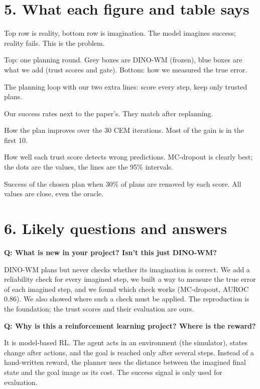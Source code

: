 \documentclass[11pt,a4paper]{article}
\newcommand{\Q}[1]{\par\medskip\noindent\textbf{\color{accent}Q: #1}\par\nopagebreak}
\newcommand{\A}{\noindent}
\begin{document}
\section*{5. What each figure and table says}
\begin{description}[leftmargin=0pt,style=nextline]
\item[Fig.~1 (failure example)] Top row is reality, bottom row is imagination. The model imagines success; reality fails. This is the problem.
\item[Fig.~2 (architecture)] Top: one planning round. Grey boxes are DINO-WM (frozen), blue boxes are what we add (trust scores and gate). Bottom: how we measured the true error.
\item[Algorithm~1] The planning loop with our two extra lines: score every step, keep only trusted plans.
\item[Table~I and Fig.~3] Our success rates next to the paper's. They match after replanning.
\item[Fig.~4] How the plan improves over the 30 CEM iterations. Most of the gain is in the first 10.
\item[Table~II and Fig.~5] How well each trust score detects wrong predictions. MC-dropout is clearly best; the dots are the values, the lines are the 95\% intervals.
\item[Table~III] Success of the chosen plan when 30\% of plans are removed by each score. All values are close, even the oracle.
\end{description}

\section*{6. Likely questions and answers}

\Q{What is new in your project? Isn't this just DINO-WM?}
\A DINO-WM plans but never checks whether its imagination is correct. We add a reliability check for every imagined
step, we built a way to measure the true error of each imagined step, and we found which check works (MC-dropout,
AUROC 0.86). We also showed where such a check must be applied. The reproduction is the foundation; the trust scores
and their evaluation are ours.

\Q{Why is this a reinforcement learning project? Where is the reward?}
\A It is model-based RL. The agent acts in an environment (the simulator), states change after actions, and the goal
is reached only after several steps. Instead of a hand-written reward, the planner uses the distance between the
imagined final state and the goal image as its cost. The success signal is only used for evaluation.
\end{document}
